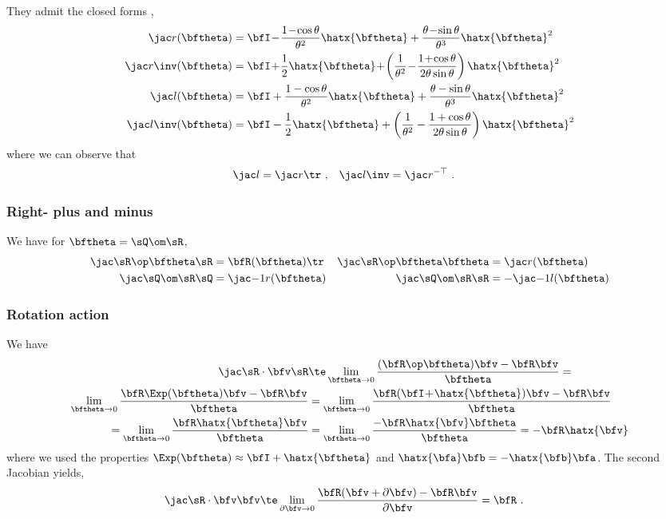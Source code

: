 They admit the closed forms \cite[pag.~40]{CHIRIKJIAN-11}, 
%
\begin{align}
\mjac{}{r}(\bth) &= \bfI \!-\! \frac{1\!-\!\cos\theta}{\theta^2}\hatx{\bth} + \frac{\theta\!-\!\sin\theta}{\theta^3}\hatx{\bth}^2\\
\mjac{}{r}\inv(\bth) &= \bfI \!+\! \frac12\hatx{\bth} \!+\! \left(\frac{1}{\theta^2} \!-\! \frac{1\!+\!\cos\theta}{2\theta\sin\theta}\right)\hatx{\bth}^2 \\
\mjac{}{l}(\bth) &= \bfI + \frac{1-\cos\theta}{\theta^2}\hatx{\bth} + \frac{\theta-\sin\theta}{\theta^3}\hatx{\bth}^2 \label{equ:SO3_Jl} \\
\mjac{}{l}\inv(\bth) &= \bfI - \frac12\hatx{\bth} + \left(\frac1{\theta^2} - \frac{1+\cos\theta}{2\theta\sin\theta}\right)\hatx{\bth}^2 \label{equ:SO3_Jl_inv}
\end{align}
%
where we can observe that
%
\begin{align}
\mjac{}{l} &= \mjac{}{r}\tr 
~,
&
\mjac{}{l}\inv &= \mjac{}{r}^{-\top}
~.
\end{align}

\subsubsection{Right- plus and minus}

We have for $\bth=\sQ\om\sR$,
%
\begin{align}
\mjac{\sR\op\bth}{\sR}   
 &= \bfR(\bth)\tr 
 &
\mjac{\sR\op\bth}{\bth} 
 &= \mjac{}{r}(\bth)
 \\
\mjac{\sQ\om\sR}{\sQ} 
 &= \mjac{-1}{r}(\bth)
 &
\mjac{\sQ\om\sR}{\sR} 
 &= -\mjac{-1}{l}(\bth) 
\end{align}
%


\subsubsection{Rotation action} 
\label{sec:jac_SO3_action}

We have
\begin{align}
\mjac{\sR\cdot\bfv}{\sR} 
\small
&\te \lim_{\bth\to0}\frac{(\bfR\op\bth)\bfv-\bfR\bfv}{\bth} = \notag \\
\lim_{\bth\to0}\frac{\bfR\Exp(\bth)\bfv-\bfR\bfv}{\bth} 
&= \lim_{\bth\to0}\frac{\bfR(\bfI\!+\!\hatx{\bth})\bfv-\bfR\bfv}{\bth} \notag \\
= \lim_{\bth\to0}\frac{\bfR\hatx{\bth}\bfv}{\bth} 
&= \lim_{\bth\to0}\frac{-\bfR\hatx{\bfv}\bth}{\bth} 
= -\bfR\hatx{\bfv} 
\end{align}
%
where we used the properties $\Exp(\bth) \approx \bfI + \hatx{\bth}$ and $\hatx{\bfa}\bfb = -\hatx{\bfb}\bfa$. 
The second Jacobian yields,
%
\begin{align}
\mjac{\sR\cdot\bfv}{\bfv}
&\te \lim_{\partial\bfv\to0}\frac{\bfR(\bfv+\partial\bfv)-\bfR\bfv}{\partial\bfv} 
= \bfR
~.
\end{align}



